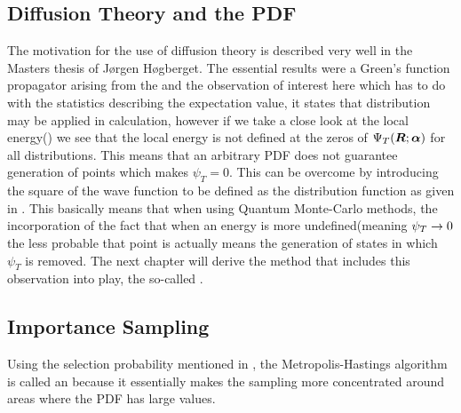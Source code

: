     \subsection{Diffusion Theory and the PDF\label{susec:diffTHpdf}}
        The motivation for the use of diffusion theory is described very well
        in the Masters thesis of Jørgen Høgberget\cite{jorgenThesis}. The
        essential results were a Green's function propagator arising from the
         and the observation of interest here
        which has to do with the statistics describing the expectation value,
        it states that  distribution may be applied in calculation,
        however if we take a close look at the local energy() we
        see that the local energy is not defined at the zeros of ${\Psi}_T(\boldsymbol{{R}};\boldsymbol{{\alpha}})$ for
        all distributions.  This means that an arbitrary PDF does not guarantee
        generation of points which makes $\psi_T=0$. This can be overcome by
        introducing the square of the wave function to be defined as the
        distribution function as given in . This basically means
        that when using Quantum Monte-Carlo methods, the incorporation of the
        fact that when an energy is more undefined(meaning $\psi_T\rightarrow 0$ the
        less probable that point is actually means the generation of states in
        which $\psi_T$ is removed. The next chapter will derive the method that
        includes this observation into play, the so-called .

    \subsection{Importance Sampling\label{susec:impSamp}}
        Using the selection probability mentioned in , the
        Metropolis-Hastings algorithm is called an 
        because it essentially makes the sampling more concentrated around
        areas where the PDF has large values.

